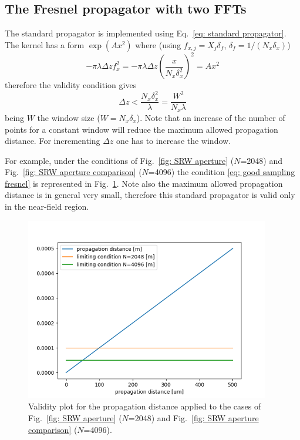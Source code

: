 \documentclass{iucr}              %
\newcommand{\inblue}[1]{{\color{blue}#1}}
\begin{document}
\subsection{The Fresnel propagator with two FFTs}
The standard propagator is implemented using Eq.~\ref{eq: standard propagator}. The kernel has a form $\exp(A x^2)$ where (using $f_{x,j}=X_j \delta_f$, $\delta_f = 1/(N_x \delta_x)$)
\begin{equation}
    -\pi \lambda \Delta z f_x^2 = 
    -\pi \lambda \Delta z \left(\frac{x}{N_x \delta_x^2} \right)^2 = A x^2 
\end{equation}
therefore the validity condition gives
\begin{equation}\label{eq: fresnel validity}
    \Delta z < \frac{N_x \delta_x^2}{\lambda}  = \frac{W^2}{N_x \lambda}
\end{equation}
being $W$ the window size ($W=N_x \delta_x$). Note that an increase of the number of points for a constant window will \inblue{reduce} the maximum allowed propagation distance. For incrementing $\Delta z$ one has to increase the window. 

For example, under the conditions of Fig.~\ref{fig: SRW aperture} ($N$=2048) and Fig.~\ref{fig: SRW aperture comparison} ($N$=4096) the condition \ref{eq: good sampling fresnel} is represented in Fig.~\ref{fig: fresnel validity}. Note also the maximum allowed propagation distance is in general very small, therefore this standard propagator is valid only in the near-field region. 


\begin{figure}\label{fig: fresnel validity}
\caption{Validity plot for the propagation distance applied to the cases of Fig.~\ref{fig: SRW aperture} ($N$=2048) and Fig.~\ref{fig: SRW aperture comparison} ($N$=4096).
}
\includegraphics[width=0.95\textwidth]{fresnel_propagator_validity.png}
\end{figure}
\end{document}
